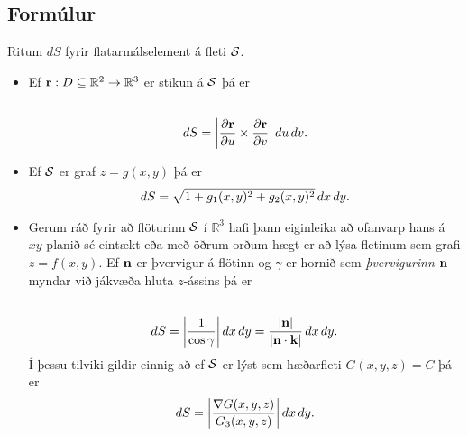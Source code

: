 \documentclass[a4paper,10pt,icelandic]{sphinxmanual}
\begin{document}
\subsection{Formúlur}
\label{Kafli5:formulur}
Ritum \(dS\) fyrir flatarmálselement á fleti \(\cal S\).
\begin{itemize}
\item {} 
Ef
\(\mbox{${\bf r}$}:D\subseteq{\mathbb  R}^2\rightarrow {\mathbb  R}^3\)
er stikun á \(\cal S\) þá er
\begin{gather}
\begin{split}\displaystyle\end{split}\notag\\\begin{split}dS=\bigg|\frac{\partial \mbox{${\bf r}$}}{\partial u}\times\frac{\partial
  \mbox{${\bf r}$}}{\partial v}\bigg|\,du\,dv.\end{split}\notag
\end{gather}
\item {} 
Ef \(\cal S\) er graf \(z=g(x,y)\) þá er
\begin{gather}
\begin{split}\displaystyle dS=\sqrt{1+g_1(x,y)^2+g_2(x,y)^2}\,dx\,dy.\end{split}\notag
\end{gather}
\item {} 
Gerum ráð fyrir að flöturinn \(\cal S\) í \({\mathbb  R}^3\)
hafi þann eiginleika að ofanvarp hans á \(xy\)-planið sé eintækt
eða með öðrum orðum hægt er að lýsa fletinum sem grafi
\(z=f(x,y)\). Ef \(\mbox{${\bf n}$}\) er þvervigur á flötinn
og \(\gamma\) er hornið sem \textit{þvervigurinn} \(\mbox{${\bf n}$}\)
myndar við jákvæða hluta \(z\)-ássins þá er
\begin{gather}
\begin{split}\displaystyle\end{split}\notag\\\begin{split}dS=\bigg|\frac{1}{\cos\gamma}\bigg|\,dx\,dy
=\frac{|\mbox{${\bf n}$}|}{|\mbox{${\bf n}$}\cdot\mbox{${\bf k}$}|}\,dx\,dy.\end{split}\notag
\end{gather}
Í þessu tilviki gildir einnig að ef \(\cal S\) er lýst sem
hæðarfleti \(G(x,y,z)=C\) þá er
\begin{gather}
\begin{split}\displaystyle dS=\bigg|\frac{\nabla G(x,y,z)}{G_3(x,y,z)}\bigg|\,dx\,dy.\end{split}\notag
\end{gather}
\end{itemize}
\end{document}
